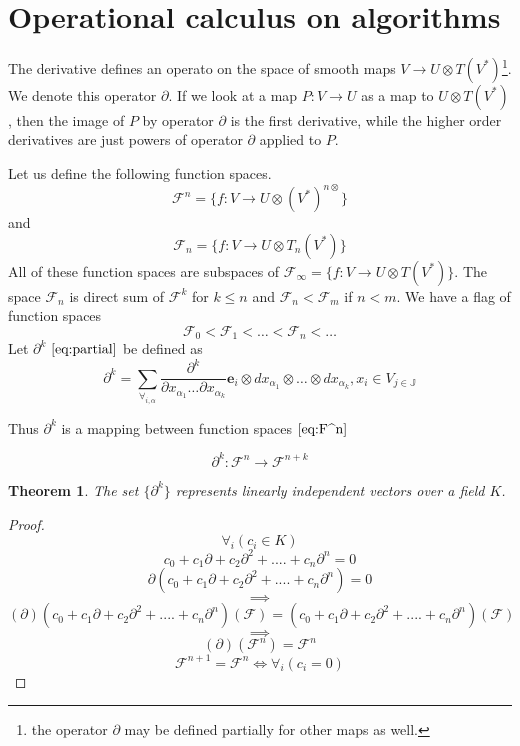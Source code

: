 \documentclass{article}
\newcommand{\JJ}{\mathbb{J}}
\newcommand{\e}{\mathbf{e}}
\newcommand{\F}{\mathcal{F}}
\newcommand{\D}{\partial}
\newtheorem{izrek}{Theorem}[section]
\begin{document}
\section{Operational calculus on algorithms}

The derivative defines an operato on the space of smooth maps $V\to U\otimes
 T(V^*)$\footnote{the operator $\D$ may be defined partially for other maps as
   well.}. We denote this operator $\D$. If we look at a map $P:V\to U$ as a map
 to $U\otimes T(V^*)$, then the image of $P$ by operator $\D$ is the first
 derivative, while the higher order derivatives are just powers of operator $\D$
 applied to $P$. 

Let us define the following function spaces.
 \begin{equation}\label{eq:F^n}
 	\F^n=\{f:V\to U\otimes(V^*)^{n\otimes}\}
 \end{equation}
 and
 \begin{equation}\label{eq:F_n}
 	\F_n=\{f:V\to U\otimes T_n(V^*)\}
 \end{equation}
All of these function spaces are subspaces of $\F_\infty=\{f:V\to U\otimes
T(V^*)\}$. The space $\F_n$ is direct sum of $\F^k$ for $k\le n$ and $\F_n<\F_m$ if $n<m$. We
have a flag of function spaces
\begin{equation}
  \label{eq:flag_function_space}
  \F_0<\F_1<\ldots<\F_n<\ldots
\end{equation}
Let $\D^k$ $\eqref{eq:partial}$ be defined as
\begin{equation}\label{eq:dd}
	\partial^k=\sum_{\forall_{i,\alpha}}\frac{\partial^k}{\partial
	    x_{\alpha_1}\ldots \partial x_{\alpha_k}}\e_i\otimes
	  dx_{\alpha_1}\otimes\ldots \otimes dx_{\alpha_k} , x_i\in V_{j\in\JJ}
\end{equation}

Thus $\D^k$ is a mapping between function spaces $\eqref{eq:F^n}$
 
 \begin{equation}\label{eq:toFn+k}
 \D^k:\F^n\to\F^{n+k}
 \end{equation}
 
 \begin{izrek}\label{izr:linearnaNeodvisnost}
  The set $\{\partial^k\}$ represents linearly independent vectors over a field $K$.
 \end{izrek}
 
 \begin{proof} 
 $$\forall_i(c_i\in K)$$
	  $$c_0+c_1\D+c_2\D^2+....+c_n\D^n=0$$
	$$\D(c_0+c_1\D+c_2\D^2+....+c_n\D^n)=0$$
	$$\implies$$
	$$(\D)(c_0+c_1\D+c_2\D^2+....+c_n\D^n)(\F)=(c_0+c_1\D+c_2\D^2+....+c_n\D^n)(\F)$$
	$$\implies$$
	$$(\D)(\F^n)=\F^n$$
	$$\F^{n+1}=\F^n\iff\forall_i(c_i=0)$$
	
 \end{proof}
 
\end{document}
